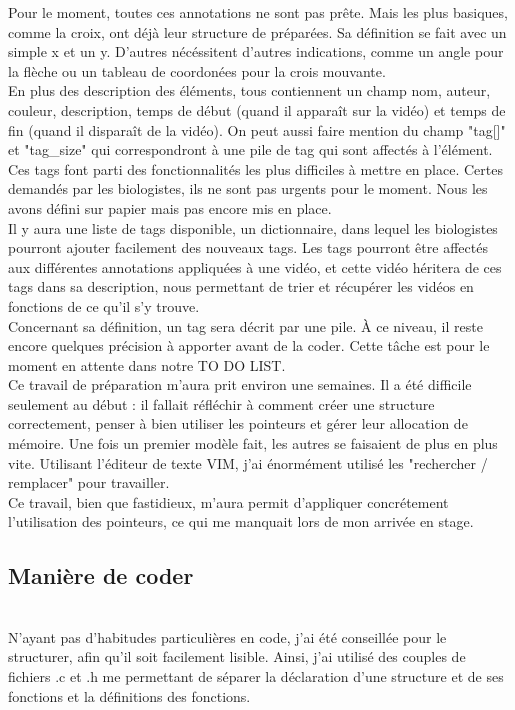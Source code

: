 \documentclass[11pt,french,a4paper]{report}
\begin{document}
Pour le moment, toutes ces annotations ne sont pas prête. Mais les plus basiques, comme la croix, ont déjà leur structure de préparées.
Sa définition se fait avec un simple x et un y. D'autres nécéssitent d'autres indications, comme un angle pour la flèche
ou un tableau de coordonées pour la crois mouvante. \\
En plus des description des éléments, tous contiennent un champ nom, auteur, couleur, description, temps de début 
(quand il apparaît sur la vidéo) et temps de fin (quand il disparaît de la vidéo). 
On peut aussi faire mention du champ "tag[]" et "tag\_size" qui correspondront à une pile de tag qui sont affectés à l'élément. \\
Ces tags font parti des fonctionnalités les plus difficiles à mettre en place. Certes demandés par les biologistes, ils ne sont 
pas urgents pour le moment. Nous les avons défini sur papier mais pas encore mis en place. \\
Il y aura une liste de tags disponible, un dictionnaire, dans lequel les biologistes pourront 
ajouter facilement des nouveaux tags. Les tags pourront être affectés aux différentes annotations appliquées
à une vidéo, et cette vidéo héritera de ces tags dans sa description, nous permettant de trier et récupérer les vidéos 
en fonctions de ce qu'il s'y trouve. \\
Concernant sa définition, un tag sera décrit par une pile. À ce niveau, il reste encore quelques précision à apporter
avant de la coder. Cette tâche est pour le moment en attente dans notre TO DO LIST.\\
Ce travail de préparation m'aura prit environ une semaines. Il a été difficile seulement au début : il fallait réfléchir 
à comment créer une structure correctement, penser à bien utiliser les pointeurs et gérer leur allocation de
mémoire. Une fois un premier modèle fait, les autres se faisaient de plus en plus vite. Utilisant l'éditeur de texte VIM, j'ai 
énormément utilisé les "rechercher / remplacer" pour travailler. \\
Ce travail, bien que fastidieux, m'aura permit d'appliquer concrétement l'utilisation des pointeurs, ce qui 
me manquait lors de mon arrivée en stage. \\ 

        \subsection{Manière de coder}\\
N'ayant pas d'habitudes particulières en code, j'ai été conseillée pour le structurer, afin qu'il 
soit facilement lisible. Ainsi, j'ai utilisé des couples de fichiers .c et .h me permettant de séparer 
la déclaration d'une structure et de ses fonctions et la définitions des fonctions.
\end{document}
